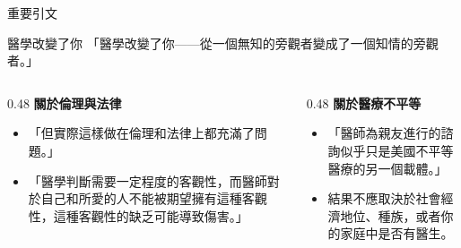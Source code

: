 \documentclass[aspectratio=169]{beamer}
\begin{document}
\begin{frame}{重要引文}
\begin{block}{\textcolor{medred}{醫學改變了你}}
「醫學改變了你——從一個無知的旁觀者變成了一個知情的旁觀者。」
\end{block}

\vspace{0.5cm}

\begin{columns}
\begin{column}{0.48\textwidth}
\textbf{\textcolor{medblue}{關於倫理與法律}}
\begin{itemize}
\item 「但實際這樣做在倫理和法律上都充滿了問題。」
\item 「醫學判斷需要一定程度的客觀性，而醫師對於自己和所愛的人不能被期望擁有這種客觀性，這種客觀性的缺乏可能導致傷害。」
\end{itemize}
\end{column}

\begin{column}{0.48\textwidth}
\textbf{\textcolor{medblue}{關於醫療不平等}}
\begin{itemize}
\item 「醫師為親友進行的諮詢似乎只是美國不平等醫療的另一個載體。」
\item 結果不應取決於社會經濟地位、種族，或者你的家庭中是否有醫生。
\end{itemize}
\end{column}
\end{columns}
\end{frame}
\end{document}
